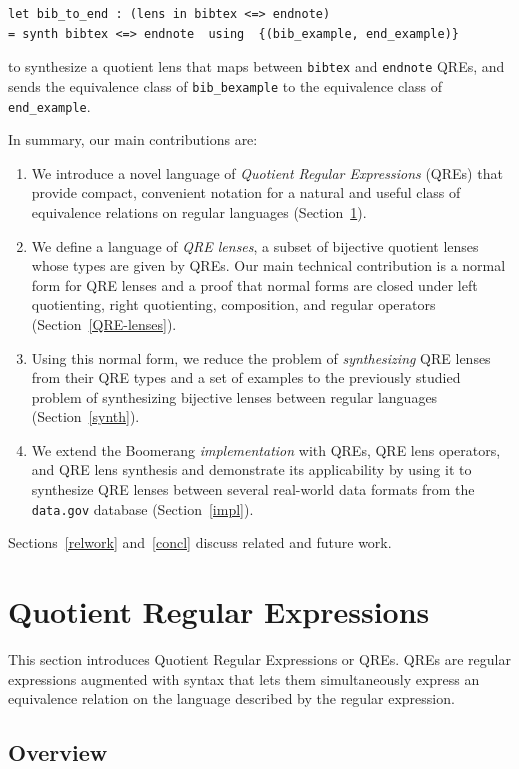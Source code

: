 \documentclass{svproc}
\newcommand{\cd}[1]{\lstinline[backgroundcolor=\color{white}]$#1$}
\begin{document}
\begin{lstlisting}
let bib_to_end : (lens in bibtex <=> endnote) 
= synth bibtex <=> endnote  using  {(bib_example, end_example)}
\end{lstlisting}
\noindent to synthesize a quotient lens that maps between \cd{bibtex} and
\cd{endnote} QREs, and sends the equivalence class of \cd{bib_bexample} to
the equivalence class of \cd{end_example}.

In summary, our main contributions are:
\begin{enumerate}
\item We introduce a novel language of {\em Quotient Regular Expressions}
(QREs) that provide compact, convenient notation for a natural and useful
class of equivalence relations on regular languages (Section~\ref{QRE}).
\item We define a language of {\em QRE lenses}, a subset of bijective quotient
lenses whose types are given by QREs.  Our main technical contribution is a
normal form for QRE lenses and a proof that normal forms are
closed under left quotienting, right quotienting, composition, and regular
operators (Section~\ref{QRE-lenses}).
\item Using this normal form, we reduce the problem of {\em synthesizing}
QRE lenses from their QRE types and a set of examples to the previously studied
problem of synthesizing bijective lenses between regular languages 
(Section~\ref{synth}).
\item We extend the Boomerang {\em implementation} with QREs, QRE lens operators,
and QRE lens synthesis and demonstrate its applicability by using it to
synthesize QRE lenses between several real-world data formats from the
{\tt data.gov} database (Section~\ref{impl}).
\end{enumerate}
Sections~\ref{relwork} and~\ref{concl} discuss related and future work.

\section{Quotient Regular Expressions}
\label{QRE}

This section introduces Quotient Regular Expressions or QREs. QREs are regular
expressions augmented with syntax that lets them simultaneously express an
equivalence relation on the language described by the regular expression.

\subsection{Overview}
\end{document}
